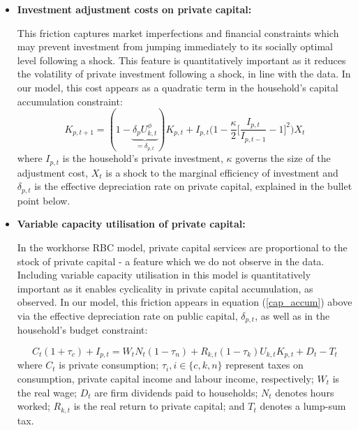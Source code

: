 \documentclass[titlepage, 11pt, a4paper]{article}
\renewcommand{\&}{and}
\begin{document}
\begin{itemize}        
    \item \textbf{Investment adjustment costs on private capital:} \par 
    This friction captures market imperfections and financial constraints which may prevent investment from jumping immediately to its socially optimal level following a shock. This feature is quantitatively important as it reduces the volatility of private investment following a shock, in line with the data. In our model, this cost appears as a quadratic term in the household's capital accumulation constraint: 
    \begin{equation} \label{cap_accum}
         K_{p,t+1} = (1-\underbrace{\delta_{p}U_{k,t}^\phi}_{=\delta_{p,t}})K_{p,t} + I_{p,t}\Big(1-\frac{\kappa}{2}\Big[ \frac{I_{p,t}}{I_{p,t-1}} -1 \Big]^2\Big)X_t
    \end{equation}
    where $I_{p,t}$ is the household's private investment, $\kappa$ governs the size of the adjustment cost, $X_t$ is a shock to the marginal efficiency of investment and $\delta_{p,t}$ is the effective depreciation rate on private capital, explained in the bullet point below.

    \item \textbf{Variable capacity utilisation of private capital:} \par 
    In the workhorse RBC model, private capital services are proportional to the stock of private capital - a feature which we do not observe in the data. Including variable capacity utilisation in this model is quantitatively important as it enables cyclicality in private capital accumulation, as observed. In our model, this friction appears in equation (\ref{cap_accum}) above via the effective depreciation rate on public capital, $\delta_{p,t}$, as well as in the household's budget constraint: 

    \begin{equation} \label{nom_BC}
        C_t(1+\tau_c) + I_{p,t}  = W_tN_t(1-\tau_n) + R_{k,t}(1-\tau_k)U_{k,t}K_{p,t} +D_t  - T_t 
    \end{equation}
    where $C_t$ is private consumption; $\tau_i,  i\in \{c,k,n\}$ represent taxes on consumption, private capital income and labour income, respectively; $W_t$ is the real wage; $D_t$ are firm dividends paid to households; $N_t$ denotes hours worked; $R_{k,t}$ is the real return to private capital; and $T_t$ denotes a lump-sum tax.  
    

\end{itemize}
\end{document}
